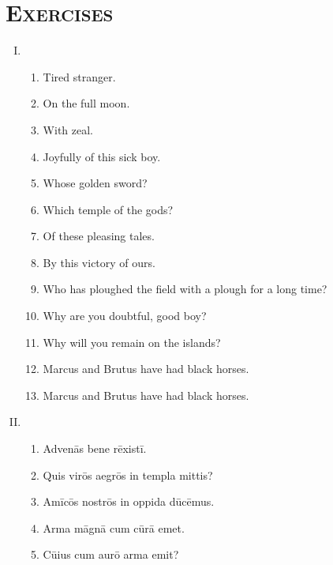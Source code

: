 \documentclass[12pt]{article}
\begin{document}
\section{\textsc{Exercises}}
\begin{enumerate}[I.]
	\setlength{\itemsep}{1em}
	\item \begin{enumerate}[1)]
		\item Tired stranger.
		\item On the full moon.
		\item With zeal.
		\item Joyfully of this sick boy.
		\item Whose golden sword?
		\item Which temple of the gods?
		\item Of these pleasing tales.
		\item By this victory of ours.
		\item Who has ploughed the field with a plough for a long time?
		\item Why are you doubtful, good boy?
		\item Why will you remain on the islands?
		\item Marcus and Brutus have had black horses.
		\item Marcus and Brutus have had black horses.
	\end{enumerate}
	\item \begin{enumerate}[1)]
		\item Advenās bene rēxistī.
		\item Quis virōs aegrōs in templa mittis?
		\item Amīcōs nostrōs in oppida dūcēmus.
		\item Arma māgnā cum cūrā emet.
		\item Cūius cum aurō arma emit?
	\end{enumerate}
\end{enumerate}

\clearpage
\end{document}
